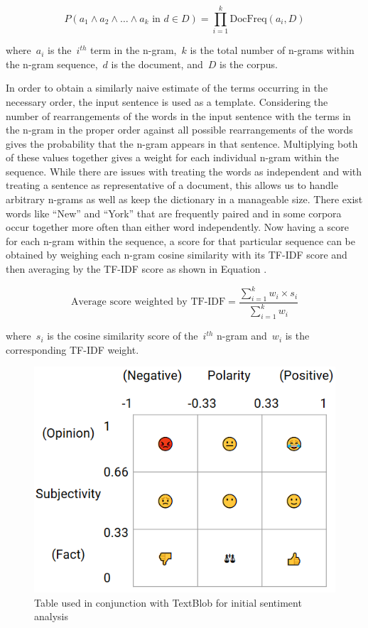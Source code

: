 \documentclass{article}[10]
\begin{document}
\begin{equation}
  P(a_{1} \land a_{2} \land \ldots \land a_{k} \textrm{ in } d \in D) = \prod_{i=1}^{k}\textrm{DocFreq}(a_{i}, D) \label{eq:TF-IDFWeighing}
\end{equation}

where~\(a_{i}\) is the~\(i^{th}\) term in the n-gram,~\(k\) is the total number of n-grams within the n-gram sequence,~\(d\) is the document, and~\(D\) is the corpus.

In order to obtain a similarly naive estimate of the terms occurring in the necessary order, the input sentence is used as a template. Considering the number of rearrangements of the words in the input sentence with the terms in the n-gram in the proper order against all possible rearrangements of the words gives the probability that the n-gram appears in that sentence. Multiplying both of these values together gives a weight for each individual n-gram within the sequence. While there are issues with treating the words as independent and with treating a sentence as representative of a document, this allows us to handle arbitrary n-grams as well as keep the dictionary in a manageable size. There exist words like ``New'' and ``York'' that are frequently paired and in some corpora occur together more often than either word independently. Now having a score for each n-gram within the sequence, a score for that particular sequence can be obtained by weighing each n-gram cosine similarity with its TF-IDF score and then averaging by the TF-IDF score as shown in Equation .

\begin{equation}
  \textrm{Average score weighted by
    TF-IDF} = \frac{\sum_{i=1}^{k}w_{i}\times s_i}{\sum_{i=1}^{k}w_{i}}\label{eq:averageTF-IDFScore}
\end{equation}

where~\(s_{i}\) is the cosine similarity score of the~\(i^{th}\) n-gram and~\(w_{i}\) is the corresponding TF-IDF weight.

\begin{figure}[H]
  \begin{center}
    \includegraphics[width=0.70\columnwidth]{figures/sentiment_table1.png}
    \caption{Table used in conjunction with TextBlob for initial sentiment
      analysis\label{fig:sentimentTable}}
  \end{center}
\end{figure}
\end{document}

